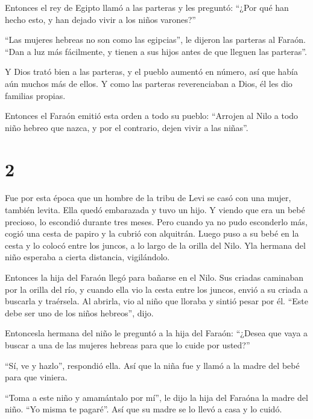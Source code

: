  Entonces el rey de Egipto llamó a las parteras y les
preguntó: ``¿Por qué han hecho esto, y han dejado vivir a los niños
varones?''

 ``Las mujeres hebreas no son como las egipcias'', le
dijeron las parteras al Faraón. ``Dan a luz más fácilmente, y tienen a
sus hijos antes de que lleguen las parteras''.

 Y Dios trató bien a las parteras, y el pueblo aumentó en
número, así que había aún muchos más de ellos.  Y como las
parteras reverenciaban a Dios, él les dio familias propias.

 Entonces el Faraón emitió esta orden a todo su pueblo:
``Arrojen al Nilo a todo niño hebreo que nazca, y por el contrario,
dejen vivir a las niñas''.

\hypertarget{section-1}{%
\section{2}\label{section-1}}

 Fue por esta época que un hombre de la tribu de Levi se
casó con una mujer, también levita.  Ella quedó embarazada y
tuvo un hijo. Y viendo que era un bebé precioso, lo escondió durante
tres meses.  Pero cuando ya no pudo esconderlo más, cogió
una cesta de papiro y la cubrió con alquitrán. Luego puso a su bebé en
la cesta y lo colocó entre los juncos, a lo largo de la orilla del Nilo.
 Yla hermana del niño esperaba a cierta distancia,
vigilándolo.

 Entonces la hija del Faraón llegó para bañarse en el Nilo.
Sus criadas caminaban por la orilla del río, y cuando ella vio la cesta
entre los juncos, envió a su criada a buscarla y traérsela. 
Al abrirla, vio al niño que lloraba y sintió pesar por él. ``Este debe
ser uno de los niños hebreos'', dijo.

 Entoncesla hermana del niño le preguntó a la hija del
Faraón: ``¿Desea que vaya a buscar a una de las mujeres hebreas para que
lo cuide por usted?''

 ``Sí, ve y hazlo'', respondió ella. Así que la niña fue y
llamó a la madre del bebé para que viniera.

 ``Toma a este niño y amamántalo por mí'', le dijo la hija
del Faraóna la madre del niño. ``Yo misma te pagaré''. Así que su madre
se lo llevó a casa y lo cuidó.

